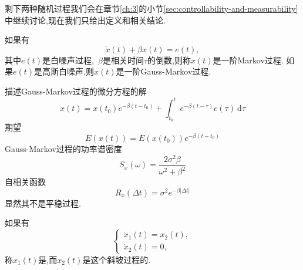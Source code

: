 \documentclass[cn,10pt,citestyle=gb7714-2015,bibstyle=gb7714-2015]{elegantbook}
\newcommand{\md}{\ \mathrm{d}}
\begin{document}
剩下两种随机过程我们会在章节\ref{ch:3}的小节\ref{sec:controllability-and-measurability}中继续讨论,现在我们只给出定义和相关结论.
\begin{definition}\label{def:Gauss-Markov-process}
  如果有
  \begin{equation}
    \dot{x}(t)+\beta x(t)=e(t),
  \end{equation}
  其中$e(t)$是白噪声过程,\ $\beta$是相关时间$\tau$的倒数,则称$x(t)$是一阶\textup{Markov}过程.
  如果$e(t)$是高斯白噪声,则$x(t)$是一阶\textup{Gauss-Markov}过程.
\end{definition}
描述Gauss-Markov过程的微分方程的解
\begin{equation}
  x(t)=x(t_0)e^{-\beta(t-t_0)}+\int_{t_0}^te^{-\beta(t-\tau)}e(\tau)\md\tau
\end{equation}
期望
\begin{equation}
  E(x(t))=E(x(t_0))e^{-\beta(t-t_0)}
\end{equation}
Gauss-Markov过程的功率谱密度
\begin{equation}
  S_x(\omega)=\frac{2\sigma^2\beta}{\omega^2+\beta^2}
\end{equation}
自相关函数
\begin{equation}
  R_x(\Delta t)=\sigma^2 e^{-\beta|\Delta t|}
\end{equation}
显然其不是平稳过程.
\begin{definition}[随机斜坡过程]\label{def:random-slope-process}
  如果有
  \begin{equation}
    \begin{cases}
      \dot{x}_1(t)=x_2(t),\\
      \dot{x}_2(t)=0,
    \end{cases}
  \end{equation}
  称$x_1(t)$是,而$x_2(t)$是这个斜坡过程的.
\end{definition}
\end{document}
